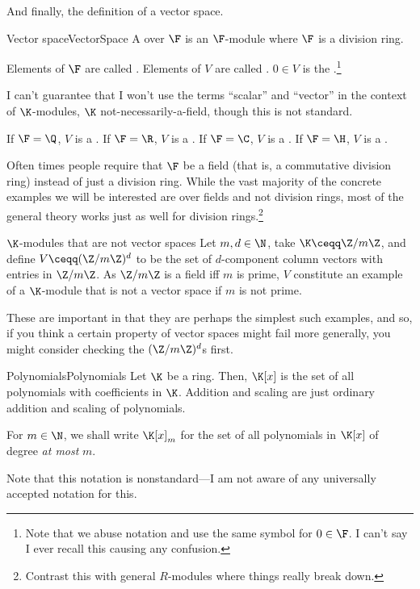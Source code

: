 And finally, the definition of a vector space.
\begin{dfn}{Vector space}{VectorSpace}
	A  over $\F$ is an $\F$-module where $\F$ is a division ring.
	\begin{rmk}
		Elements of $\F$ are called .  Elements of $V$ are called .  $0\in V$ is the .\footnote{Note that we abuse notation and use the same symbol for $0\in \F$.  I can't say I ever recall this causing any confusion.}
		
		I can't guarantee that I won't use the terms ``scalar'' and ``vector'' in the context of $\K$-modules, $\K$ not-necessarily-a-field, though this is not standard.
	\end{rmk}
	\begin{rmk}
		If $\F=\Q$, $V$ is a .  If $\F =\R$, $V$ is a .  If $\F =\C$, $V$ is a .  If $\F =\H$, $V$ is a \index{Quaternionic vector space}.
	\end{rmk}
	\begin{rmk}
		Often times people require that $\F$ be a field (that is, a commutative division ring) instead of just a division ring.  While the vast majority of the concrete examples we will be interested are over fields and not division rings, most of the general theory works just as well for division rings.\footnote{Contrast this with general $R$-modules where things really break down.}
	\end{rmk}
\end{dfn}
\begin{exm}{$\K$-modules that are not vector spaces}{}
	Let $m,d\in \N$, take $\K \ceqq \Z /m\Z$, and define $V\ceqq (\Z /m\Z )^d$ to be the set of $d$-component column vectors with entries in $\Z /m\Z$.  As $\Z /m\Z$ is a field iff $m$ is prime, $V$ constitute an example of a $\K$-module that is not a vector space if $m$ is not prime.
	
	These are important in that they are perhaps the simplest such examples, and so, if you think a certain property of vector spaces might fail more generally, you might consider checking the $(\Z /m\Z )^d$s first.
\end{exm}
\begin{exm}{Polynomials}{Polynomials}
	Let $\K$ be a ring.  Then, $\K [x]$\index[notation]{$\K [x]$} is the set of all polynomials with coefficients in $\K$.  Addition and scaling are just ordinary addition and scaling of polynomials.
	
	For $m\in \N$, we shall write $\K [x]_m$ for the set of all polynomials in $\K [x]$ of degree \emph{at most} $m$.
	\begin{rmk}
		Note that this notation is nonstandard---I am not aware of any universally accepted notation for this.
	\end{rmk}
\end{exm}
